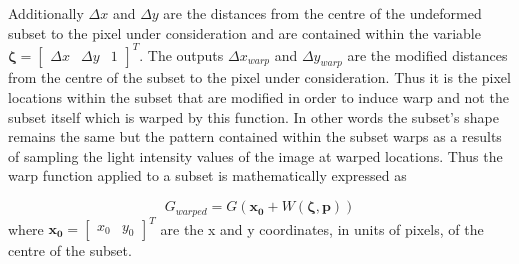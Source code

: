 \documentclass[12pt,oneside,openany,a4paper, %
english, %
masters-t, goldenblock]{usthesis}
\begin{document}

Additionally $\Delta x$ and $\Delta y$ are the distances from the centre of the undeformed subset to the pixel under consideration and are contained within the variable $\bm{\zeta} = \begin{bmatrix} \Delta x & \Delta y & 1 \end{bmatrix}^T$. The outputs $\Delta x_{warp}$ and $\Delta y_{warp}$ are the modified distances from the centre of the subset to the pixel under consideration. 
Thus it is the pixel locations within the subset that are modified in order to induce warp and not the subset itself which is warped by this function. In other words the subset's shape remains the same but the pattern contained within the subset warps as a results of sampling the light intensity values of the image at warped locations. Thus the warp function applied to a subset is mathematically expressed as


\begin{equation}
  G_{warped}=G(\bm{x_0}+W(\bm{\zeta},\bm{p}))
  \label{eq:subset warp}
\end{equation}
where $\bm{x_0} = \begin{bmatrix} x_0 & y_0 \end{bmatrix}^T$ are the x and y coordinates, in units of pixels, of the centre of the subset. 
\end{document}
